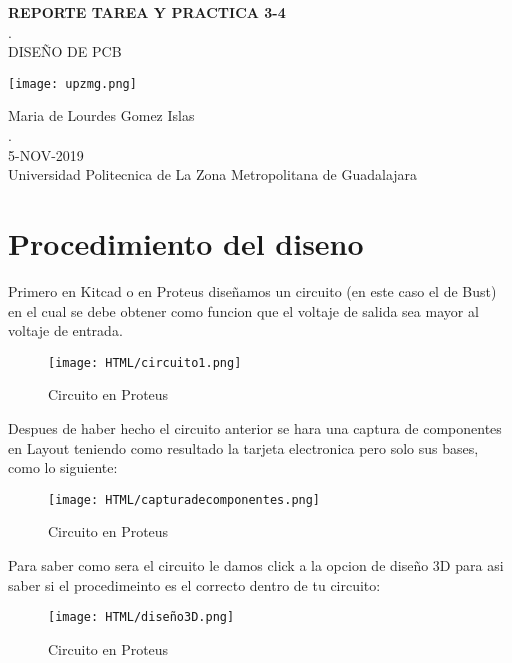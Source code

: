 \documentclass[11pt,a4paper]{article}
\begin{document}
\begin{center}
\textbf{REPORTE TAREA Y PRACTICA 3-4}\\
.\\
DISEÑO DE PCB\\
\end{center}
\texttt{[image: upzmg.png]} 
\begin{figure}[h]
\centering

\end{figure}

\begin{center}
Maria de Lourdes Gomez Islas\\
.\\
5-NOV-2019\\
Universidad Politecnica de La Zona Metropolitana de Guadalajara
\end{center}

\newpage

\section{Procedimiento del diseno}

Primero en Kitcad o en Proteus diseñamos un circuito (en este caso el de Bust) en el cual se debe obtener como funcion que el voltaje de salida sea mayor al voltaje de entrada.

\begin{figure}[h]
\centering
\texttt{[image: HTML/circuito1.png]} 
\caption{Circuito en Proteus}
\end{figure}

Despues de haber hecho el circuito anterior se hara una captura de componentes en Layout teniendo como resultado la tarjeta electronica pero solo sus bases, como lo siguiente:\\

\begin{figure}[h]
\centering
\texttt{[image: HTML/capturadecomponentes.png]} 
\caption{Circuito en Proteus}
\end{figure}

\newpage 

Para saber como sera el circuito le damos click a la opcion de diseño 3D para asi saber si el procedimeinto es el correcto dentro de tu circuito:\\
 
\begin{figure}[h]
\centering
\texttt{[image: HTML/diseño3D.png]} 
\caption{Circuito en Proteus}
\end{figure}
\end{document}
